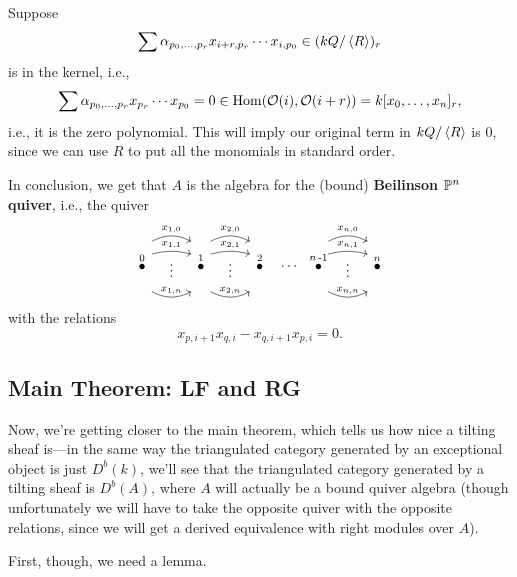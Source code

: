 \documentclass[12pt]{article}
\begin{document}
\begin{eg}
    Suppose
    \[\sum \alpha_{p_0,\dots,p_r} x_{i+r,p_r} \cdots x_{i,p_0} \in (kQ/\<R\>)_r\]
    is in the kernel, i.e.,
    \[\sum \alpha_{p_0,\dots,p_r} x_{p_r} \cdots x_{p_0} = 0 \in \Hom(\cO(i),\cO(i+r)) = k[x_0,\dots,x_n]_r,\]
    i.e., it is the zero polynomial. This will imply our original term in $kQ/\<R\>$ is 0, since we can use $R$ to put all the monomials in standard order.

    In conclusion, we get that $A$ is the algebra for the (bound) \textbf{Beilinson $\P^n$ quiver}, i.e., the quiver
    \[\begin{tikzcd}[column sep=1cm]
        \overset{0}{\bullet} \rar[bend left=1cm, shift left=0.5cm,"x_{1,0}"] \rar[bend left=0.5cm, shift left=0.25cm,"x_{1,1}"] \rar[shift left=0cm, phantom, "\vdots"] \rar[bend left=-1cm, shift left=-0.5cm,"x_{1,n}"] & \overset{1}{\bullet} \rar[bend left=1cm, shift left=0.5cm,"x_{2,0}"] \rar[bend left=0.5cm, shift left=0.25cm,"x_{2,1}"] \rar[shift left=0cm, phantom, "\vdots"] \rar[bend left=-1cm, shift left=-0.5cm,"x_{2,n}"] & \overset{2}{\bullet} \rar[phantom,"\cdots"] & \bullet \ar[phantom, "n\,\text{-}1"{font=\scriptsize,above=2pt}] \rar[bend left=1cm, shift left=0.5cm,"x_{n,0}"] \rar[bend left=0.5cm, shift left=0.25cm,"x_{n,1}"] \rar[shift left=0cm, phantom, "\vdots"] \rar[bend left=-1cm, shift left=-0.5cm,"x_{n,n}"] & \overset{n}{\bullet}
    \end{tikzcd}\]
    with the relations
    \[x_{p,i+1}x_{q,i} - x_{q,i+1}x_{p,i} = 0.\]
\end{eg}


\subsection{Main Theorem: LF and RG}
Now, we're getting closer to the main theorem, which tells us how nice a tilting sheaf is---in the same way the triangulated category generated by an exceptional object is just $D^b(k)$, we'll see that the triangulated category generated by a tilting sheaf is $D^b(A)$, where $A$ will actually be a bound quiver algebra (though unfortunately we will have to take the opposite quiver with the opposite relations, since we will get a derived equivalence with right modules over $A$).

First, though, we need a lemma.
\end{document}
